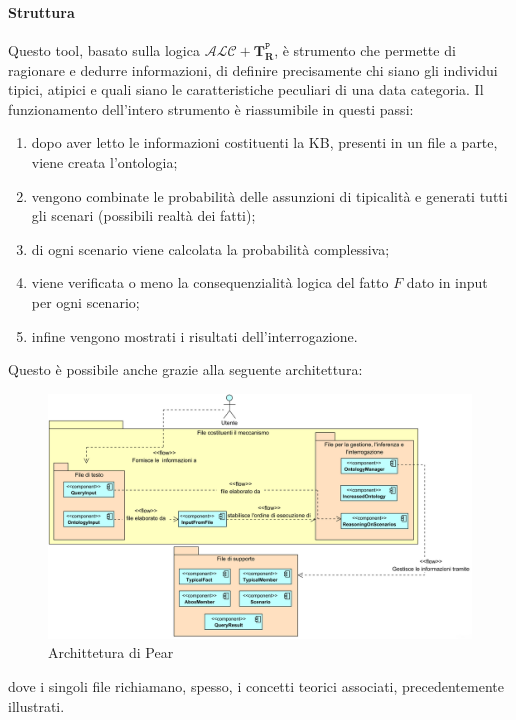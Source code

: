 \paragraph{Struttura}Questo tool, basato sulla logica $ \mathcal{ALC} + \mathbf{T}_{\mathbf{R}}^{\mathtt{P}} $, è strumento 
che permette di ragionare e dedurre informazioni, di definire 
precisamente chi siano gli individui tipici, atipici e quali siano
le caratteristiche peculiari di una data categoria.
Il funzionamento dell'intero strumento è riassumibile in questi passi:
\begin{enumerate}
	\item dopo aver letto le informazioni costituenti la KB, presenti in un file a parte, 
	viene creata l’ontologia;
	\item vengono combinate le probabilità delle assunzioni di tipicalità e generati tutti 
	gli scenari (possibili realtà dei fatti);
	\item di ogni scenario viene calcolata la probabilità complessiva;
	\item viene verificata o meno la consequenzialità logica del fatto $ F $ dato in input per ogni scenario;
	\item infine vengono mostrati i risultati dell'interrogazione.
\end{enumerate}
Questo è possibile anche grazie alla seguente architettura:
\begin{figure}[ht]
	\centering
	\includegraphics[width=\linewidth]{immagini/architetturaPEAR.png}
	\caption{Archittetura di Pear}
\end{figure}
dove i singoli file richiamano, spesso, i concetti teorici associati, precedentemente illustrati.
